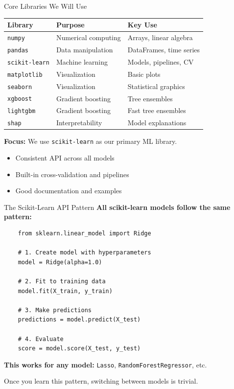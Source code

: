 \documentclass[10pt]{beamer}
\newcommand{\highlight}[1]{\textcolor{AccentOrange}{\textbf{#1}}}
\begin{document}
\begin{frame}{Core Libraries We Will Use}
  \begin{center}
  \begin{tabular}{lll}
    \toprule
    \textbf{Library} & \textbf{Purpose} & \textbf{Key Use} \\
    \midrule
    \texttt{numpy} & Numerical computing & Arrays, linear algebra \\
    \texttt{pandas} & Data manipulation & DataFrames, time series \\
    \texttt{scikit-learn} & Machine learning & Models, pipelines, CV \\
    \texttt{matplotlib} & Visualization & Basic plots \\
    \texttt{seaborn} & Visualization & Statistical graphics \\
    \midrule
    \texttt{xgboost} & Gradient boosting & Tree ensembles \\
    \texttt{lightgbm} & Gradient boosting & Fast tree ensembles \\
    \texttt{shap} & Interpretability & Model explanations \\
    \bottomrule
  \end{tabular}
  \end{center}
  
  \vspace{1em}
  \textbf{Focus:} We use \texttt{scikit-learn} as our primary ML library.
  \begin{itemize}
    \item Consistent API across all models
    \item Built-in cross-validation and pipelines
    \item Good documentation and examples
  \end{itemize}
\end{frame}

\begin{frame}[fragile]{The Scikit-Learn API Pattern}
  \textbf{All scikit-learn models follow the same pattern:}
  
  \vspace{0.5em}
\begin{verbatim}
    from sklearn.linear_model import Ridge
    
    # 1. Create model with hyperparameters
    model = Ridge(alpha=1.0)
    
    # 2. Fit to training data
    model.fit(X_train, y_train)
    
    # 3. Make predictions
    predictions = model.predict(X_test)
    
    # 4. Evaluate
    score = model.score(X_test, y_test)
\end{verbatim}
  
  \vspace{0.5em}
  \highlight{This works for any model:} \texttt{Lasso}, \texttt{RandomForestRegressor}, etc.
  
  \vspace{0.5em}
  Once you learn this pattern, switching between models is trivial.
\end{frame}
\end{document}
